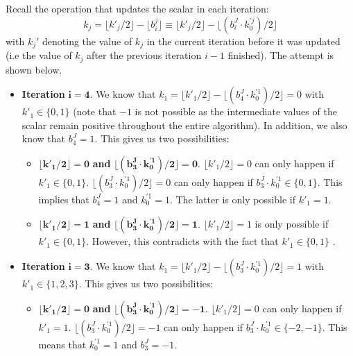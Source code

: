 Recall the operation that updates the scalar in each iteration:
%
\begin{equation*}
k_j = \lfloor k'_j / 2 \rfloor - \lfloor b_i^j \rfloor \equiv \lfloor k'_j / 2 \rfloor - \lfloor (b_i^J \cdot k_0^{\prime j} ) / 2 \rfloor 
\end{equation*}
%
with $k_j'$ denoting the value of $k_j$ in the current iteration before it was updated (i.e the value of $k_j$ after the previous iteration $i - 1$ finished).
The attempt is shown below.
%
\begin{itemize}
	\item \textbf{Iteration} $\bm{i = 4}$. 	We know that $k_1 = \lfloor k'_1 / 2 \rfloor - \lfloor (b_4^J \cdot k_0^{\prime 1} ) / 2 \rfloor = 0$ with $k'_1 \in \{0, 1\}$ (note that $-1$ is not possible as the intermediate values of the scalar remain positive throughout the entire algorithm). 
	In addition, we also know that $b_4^J = 1$.
	This gives us two possibilities:
	\begin{itemize}
		\item $\bm{ \lfloor k'_1 / 2 \rfloor = 0 }$ \textbf{and} $ \bm{ \lfloor (b_3^J \cdot k_0^{\prime 1}) / 2 \rfloor = 0 }$. 
		$\lfloor k'_1 / 2 \rfloor = 0$ can only happen if $k'_1 \in \{0, 1\}$. $\lfloor (b_3^J \cdot k_0^{\prime 1}) / 2 \rfloor = 0$ can only happen if $b_3^J \cdot k_0^{\prime 1} \in \{0, 1\}$. This implies that $b_4^J = 1$ and $ k_0^{\prime 1} = 1$. The latter is only possible if $k'_1 = 1$.
		
		\item  $\bm{ \lfloor k'_1 / 2 \rfloor = 1 }$ \textbf{and} $ \bm{ \lfloor (b_3^J \cdot k_0^{\prime 1}) / 2 \rfloor = 1 }$. 
		$ \lfloor k'_1 / 2 \rfloor = 1$ is only possible if $k'_1 \in \{0, 1\}$. However, this contradicts with the fact that $k'_1 \in \{0, 1\}$ \Lightning.
	\end{itemize}
	
	\item \textbf{Iteration} $\bm{i = 3}$. We know that $k_1 = \lfloor k'_1 / 2 \rfloor - \lfloor (b_3^J \cdot k_0^{\prime 1}) / 2 \rfloor = 1$ with $k'_1 \in \{1, 2, 3\}$. This gives us two possibilities:
	\begin{itemize}
		\item $\bm{ \lfloor k'_1 / 2 \rfloor = 0 }$ \textbf{and} $ \bm{ \lfloor (b_3^J \cdot k_0^{\prime 1}) / 2 \rfloor = -1 }$. 
		$\lfloor k'_1 / 2 \rfloor = 0 $ can only happen if $k'_1 = 1$. $\lfloor (b_3^J \cdot k_0^{\prime 1}) / 2 \rfloor = -1$ can only happen if $b_3^J \cdot k_0^{\prime 1} \in \{-2, -1 \}$. This means that $k_0^{\prime 1} = 1$ and $b_3^J = -1$.
		

\end{itemize}
\end{itemize}
